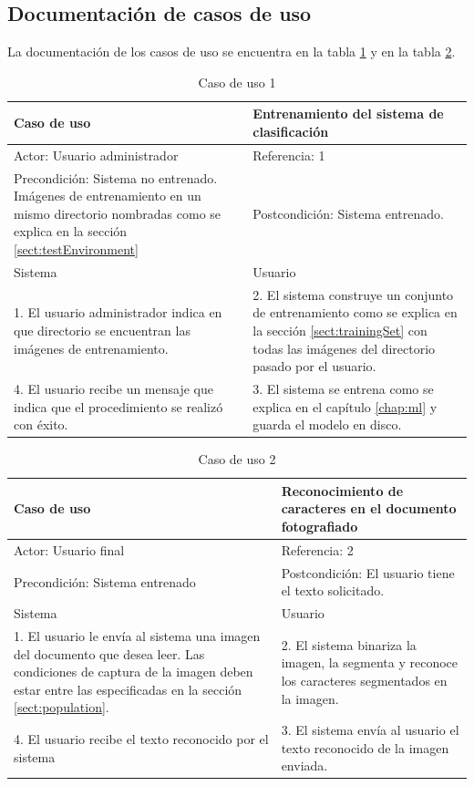 \documentclass[a4paper, 11pt, oneside]{report}
\begin{document}
\subsection{Documentación de casos de uso}

La documentación de los casos de uso se encuentra en la tabla \ref{tb:uc1} y en la tabla \ref{tb:uc2}.

\begin{table}
\begin{center}
\begin{tabular}{|p{6cm}|p{6cm}|}
	\hline
	Caso de uso & Entrenamiento del sistema de clasificación\\
	\hline
	Actor: Usuario administrador & Referencia: 1 \\
	\hline
	Precondición: Sistema no entrenado. Imágenes de entrenamiento en un mismo directorio nombradas como se explica en la sección \ref{sect:testEnvironment} & 
	Postcondición: Sistema entrenado. \\
	\hline
	Sistema & Usuario \\
	\hline
	1. El usuario administrador indica en que directorio se encuentran las imágenes de entrenamiento. &
	2. El sistema construye un conjunto de entrenamiento como se explica en la sección \ref{sect:trainingSet} con todas las imágenes del directorio pasado por el usuario. \\
	\hline
	4. El usuario recibe un mensaje que indica que el procedimiento se realizó c\label{eq:hu}on éxito. &
	3. El sistema se entrena como se explica en el capítulo \ref{chap:ml} y guarda el modelo en disco. \\
	\hline
\end{tabular}
\end{center}
\caption{Caso de uso 1}	
\label{tb:uc1}
\end{table}

\begin{table}
\begin{center}
\begin{tabular}{|p{6cm}|p{6cm}|}
	\hline
	Caso de uso & Reconocimiento de caracteres en el documento fotografiado\\
	\hline
	Actor: Usuario final & Referencia: 2 \\
	\hline
	Precondición: Sistema entrenado & Postcondición: El usuario tiene el texto solicitado. \\
	\hline
	Sistema & Usuario \\
	\hline
	1. El usuario le envía al sistema una imagen del documento que desea leer. Las condiciones de captura de la imagen deben estar entre las especificadas en la sección \ref{sect:population}. &
	2. El sistema binariza la imagen, la segmenta y reconoce los caracteres segmentados en la imagen. \\
	\hline
	4. El usuario recibe el texto reconocido por el sistema &
	3. El sistema envía al usuario el texto reconocido de la imagen enviada. \\
	\hline
\end{tabular}
\end{center}
\caption{Caso de uso 2}	
\label{tb:uc2}
\end{table}
\end{document}
